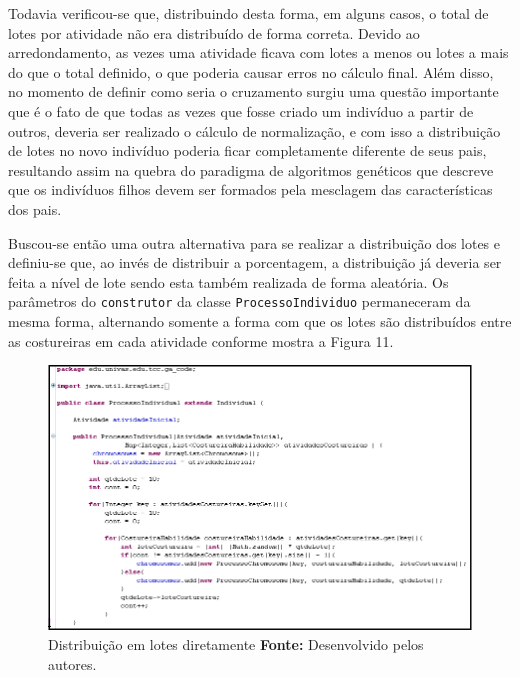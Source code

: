  \par Todavia verificou-se que, distribuindo desta forma, em alguns casos, o total de lotes por atividade não era distribuído
 de forma correta. Devido ao arredondamento, as vezes uma atividade ficava com lotes a menos ou lotes a mais do que o total
 definido, o que poderia causar erros no cálculo final. Além disso, no momento de definir como seria o cruzamento 
 surgiu uma questão importante que é o fato de que todas as vezes que fosse criado um indivíduo a partir de outros, deveria
 ser realizado o cálculo de normalização, e com isso a distribuição de lotes no novo indivíduo poderia ficar completamente
 diferente de seus pais, resultando assim na quebra do paradigma de algoritmos genéticos que descreve que os indivíduos filhos
 devem ser formados pela mesclagem das características dos pais. 


\par Buscou-se então uma outra alternativa para se realizar a distribuição dos lotes e definiu-se que, ao invés de distribuir
a porcentagem, a distribuição já deveria ser feita a nível de lote sendo esta também realizada de forma aleatória. Os parâmetros
do \texttt{construtor} da classe \texttt{ProcessoIndividuo} permaneceram da mesma forma, alternando somente a forma com que 
os lotes são distribuídos entre as costureiras em cada atividade conforme mostra a Figura 11.

\begin{figure}[h!]
	\centerline{\includegraphics[scale=0.7]{./imagens/tentativa_2_individual.png}}
	\caption[Distribuição de lotes]
	{Distribuição em lotes diretamente \textbf{Fonte:} Desenvolvido pelos autores.}
	\label{fig:exemplo1}
\end{figure}

